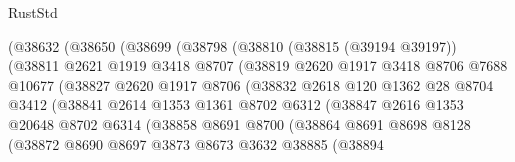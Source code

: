\begin{lexlean}{RustStd}
\begin{coremodule}
                      (@38632
                        (@38650
                          (@38699
                            (@38798
                              (@38810
                                (@38815 (@39194 @39197))
                                (@38811
                                  @2621
                                  @1919
                                  @3418
                                  @8707
                                  (@38819
                                    @2620
                                    @1917
                                    @3418
                                    @8706
                                    @7688
                                    @10677
                                    (@38827
                                      @2620
                                      @1917
                                      @8706
                                      (@38832
                                        @2618
                                        @120
                                        @1362
                                        @28
                                        @8704
                                        @3412
                                        (@38841
                                          @2614
                                          @1353
                                          @1361
                                          @8702
                                          @6312
                                          (@38847
                                            @2616
                                            @1353
                                            @20648
                                            @8702
                                            @6314
                                            (@38858
                                              @8691
                                              @8700
                                              (@38864
                                                @8691
                                                @8698
                                                @8128
                                                (@38872
                                                  @8690
                                                  @8697
                                                  @3873
                                                  @8673
                                                  @3632
                                                  @38885
                                                  (@38894

\end{coremodule}
\end{lexlean}
